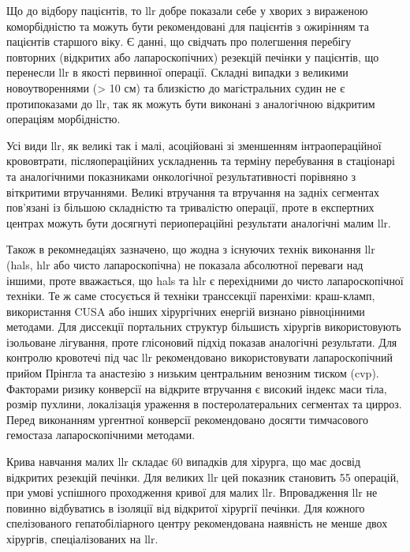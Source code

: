 \begin{refsection}
Що до відбору пацієнтів, то \acrshort{llr} добре показали себе у хворих з вираженою коморбідністю та можуть бути рекомендовані для пацієнтів з ожирінням та пацієнтів старшого віку. Є данні, що свідчать про полегшення перебігу повторних (відкритих або лапароскопічних) резекцій печінки у пацієнтів, що перенесли \acrshort{llr} в якості первинної операції. Складні випадки з великими новоутвореннями (> 10 см) та близкістю до магістральних судин не є протипоказами до \acrshort{llr}, так як можуть бути виконані з аналогічною відкритим операціям  морбідністю.

Усі види \acrshort{llr}, як великі так і малі, асоційовані зі зменшенням інтраопераційної крововтрати, післяопераційних ускладненнь та терміну перебування в стаціонарі та аналогічними показниками онкологічної результативності порівняно з віткритими втручаннями. Великі втручання та втручання на задніх сегментах пов'язані із більшою складністю та тривалістю операції, проте в експертних центрах можуть бути досягнуті периопераційні результати аналогічні малим \acrshort{llr}.

Також в рекомнедаціях зазначено, що жодна з існуючих технік виконання \acrshort{llr} (\acrshort{hals}, \acrshort{hlr} або чисто лапароскопічна) не показала абсолютної переваги над іншими, проте вважається, що \acrshort{hals} та \acrshort{hlr} є перехідними до чисто лапароскопічної техніки. Те ж саме стосується й техніки транссекції паренхіми: краш-кламп, використання CUSA або інших хірургічних енергій визнано рівноцінними методами. Для диссекції портальних структур більшисть хірургів використовують ізольоване лігування, проте глісоновий підхід показав аналогічні результати. Для контролю кровотечі під час \acrshort{llr} рекомендовано використовувати лапароскопічний прийом Прінгла та анастезію з низьким центральним венозним тиском (\acrshort{cvp}). Факторами ризику конверсії на відкрите втручання є високий індекс маси тіла, розмір пухлини, локалізація ураження в постеролатеральних сегментах та цирроз. Перед виконанням ургентної конверсії рекомендовано досягти тимчасового гемостаза лапароскопічними методами.

Крива навчання малих \acrshort{llr} складає 60 випадків для хірурга, що має досвід відкритих резекцій печінки. Для великих \acrshort{llr} цей показник становить 55 операцій, при умові успішного проходження кривої для малих \acrshort{llr}. Впровадження \acrshort{llr} не повинно відбуватись в ізоляції від відкритої хірургії печінки. Для кожного спелізованого гепатобіліарного центру рекомендована наявність не менше двох хірургів, спеціалізованих на \acrshort{llr}.


\end{refsection}
